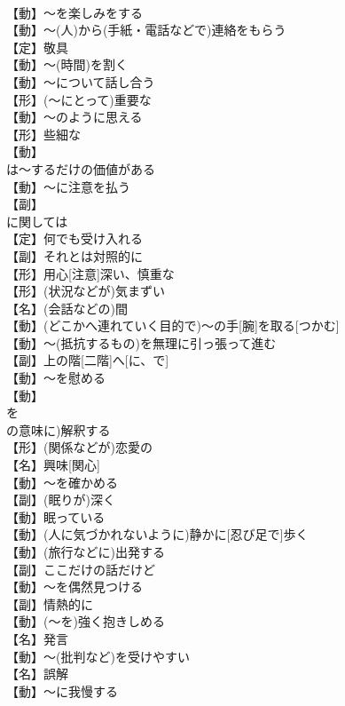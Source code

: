 \documentclass[8pt]{extreport}
\begin{document}
\begin{CJK}{UTF8}{min}
\\	【動】～を楽しみをする
\\	【動】～(人)から(手紙・電話などで)連絡をもらう
\\	【定】敬具
\\	【動】～(時間)を割く
\\	【動】～について話し合う
\\	【形】(～にとって)重要な
\\	【動】～のように思える
\\	【形】些細な
\\	【動】
\\	は～するだけの価値がある
\\	【動】～に注意を払う
\\	【副】
\\	に関しては
\\	【定】何でも受け入れる
\\	【副】それとは対照的に
\\	【形】用心[注意]深い、慎重な
\\	【形】(状況などが)気まずい
\\	【名】(会話などの)間
\\	【動】(どこかへ連れていく目的で)～の手[腕]を取る[つかむ]
\\	【動】～(抵抗するもの)を無理に引っ張って進む
\\	【副】上の階[二階]へ[に、で]
\\	【動】～を慰める
\\	【動】
\\	を
\\	の意味に)解釈する
\\	【形】(関係などが)恋愛の
\\	【名】興味[関心]
\\	【動】～を確かめる
\\	【副】(眠りが)深く
\\	【動】眠っている
\\	【動】(人に気づかれないように)静かに[忍び足で]歩く
\\	【動】(旅行などに)出発する
\\	【副】ここだけの話だけど
\\	【動】～を偶然見つける
\\	【副】情熱的に
\\	【動】(～を)強く抱きしめる
\\	【名】発言
\\	【動】～(批判など)を受けやすい
\\	【名】誤解
\\	【動】～に我慢する

\end{CJK}
\end{document}
